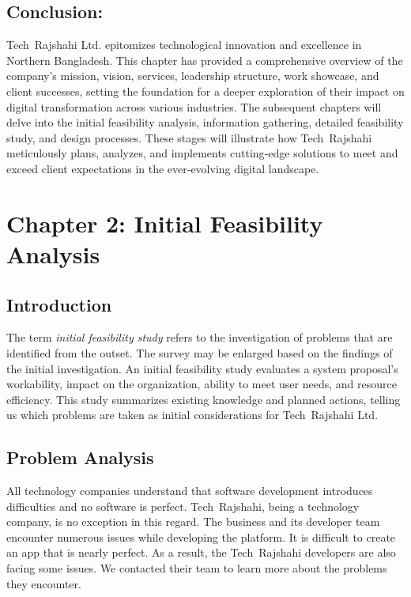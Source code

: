 \documentclass[12pt,a4paper]{article}
\begin{document}
\subsection{Conclusion:} Tech Rajshahi Ltd. epitomizes technological innovation and excellence in Northern Bangladesh.  This chapter has provided a comprehensive overview of the company’s mission, vision, services, leadership structure, work showcase, and client successes, setting the foundation for a deeper exploration of their impact on digital transformation across various industries.  The subsequent chapters will delve into the initial feasibility analysis, information gathering, detailed feasibility study, and design processes.  These stages will illustrate how Tech Rajshahi meticulously plans, analyzes, and implements cutting‑edge solutions to meet and exceed client expectations in the ever‑evolving digital landscape.

\newpage

\section{Chapter 2: Initial Feasibility Analysis}

\subsection{Introduction}
The term \emph{initial feasibility study} refers to the investigation of problems that are identified from the outset.  The survey may be enlarged based on the findings of the initial investigation.  An initial feasibility study evaluates a system proposal’s workability, impact on the organization, ability to meet user needs, and resource efficiency.  This study summarizes existing knowledge and planned actions, telling us which problems are taken as initial considerations for Tech Rajshahi Ltd.

\subsection{Problem Analysis}
All technology companies understand that software development introduces difficulties and no software is perfect.  Tech Rajshahi, being a technology company, is no exception in this regard.  The business and its developer team encounter numerous issues while developing the platform.  It is difficult to create an app that is nearly perfect.  As a result, the Tech Rajshahi developers are also facing some issues.  We contacted their team to learn more about the problems they encounter.
\end{document}
